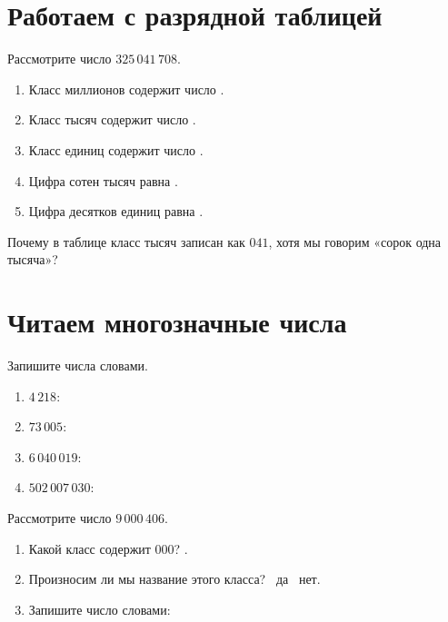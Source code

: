 \section{Работаем с разрядной таблицей}

Рассмотрите число \(325\,041\,708\).

\classworksheetfigure

\begin{fillbox}
  \begin{enumerate}
    \item Класс миллионов содержит число \answerblank[18mm].
    \item Класс тысяч содержит число \answerblank[18mm].
    \item Класс единиц содержит число \answerblank[18mm].
    \item Цифра сотен тысяч равна \answerblank[12mm].
    \item Цифра десятков единиц равна \answerblank[12mm].
  \end{enumerate}
\end{fillbox}

\begin{thinkbox}
  Почему в таблице класс тысяч записан как \(041\), хотя мы говорим
  «сорок одна тысяча»?
\end{thinkbox}

\section{Читаем многозначные числа}

\readingroutefigure

Запишите числа словами.

\begin{fillbox}
  \begin{enumerate}
    \item \(4\,218\):
    \item \(73\,005\):
    \item \(6\,040\,019\):
    \item \(502\,007\,030\):
  \end{enumerate}
\end{fillbox}

\begin{checkpointbox}
  Рассмотрите число \(9\,000\,406\).
  \zeroclassfigure
  \begin{enumerate}
    \item Какой класс содержит \(000\)? \answerblank[30mm].
    \item Произносим ли мы название этого класса? \choicebox\ да \quad \choicebox\ нет.
    \item Запишите число словами:
  \end{enumerate}
\end{checkpointbox}

